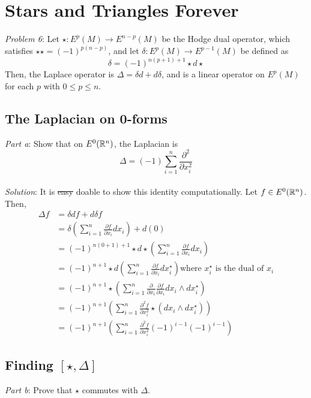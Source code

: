 \section{Stars and Triangles Forever}

\emph{Problem 6}: Let $\star: E^p(M)\to E^{n-p}(M)$ be the Hodge dual operator,
which satisfies $\star \star = (-1)^{p(n-p)}$, and let
$\delta: E^p(M) \to E^{p-1}(M)$ be defined as
\[
\delta = (-1)^{n(p+1)+1}\star d \star
\]
Then, the Laplace operator is
$\Delta = \delta d + d\delta$, and is a linear operator on $E^p(M)$ for each $p$
with $0 \leq p \leq n$. 

\subsection*{The Laplacian on 0-forms}
\emph{Part a}: Show that on $E^0(\mathbb{R}^n)$, the Laplacian is
\[
\Delta = (-1)\sum_{i=1}^n \frac{\partial^2}{\partial x_i^2}
\]
\\


\emph{Solution}:
It is \sout{easy} doable to show this identity computationally. Let $f\in
E^0(\mathbb{R}^n)$. Then,
\[
\begin{aligned}
\Delta f &= \delta df + d\delta f\\
         &= \delta \left(\sum_{i=1}^{n}
                \frac{\partial f}{\partial x_i}dx_i\right) + d(0)\\
         &= (-1)^{n(0+1)+1}\star d \star \left(\sum_{i=1}^{n}
                \frac{\partial f}{\partial x_i}dx_i\right)\\
         &= (-1)^{n+1} \star d \left(\sum_{i=1}^{n}
                \frac{\partial f}{\partial x_i}dx_i^{\star}\right)
                \text{where $x_i^{\star}$ is the dual of $x_i$}\\
         &= (-1)^{n+1} \star \left(\sum_{i=1}^{n}\frac{\partial}{\partial x_i}
                \frac{\partial f}{\partial x_i}dx_i \wedge dx_i^{\star}\right)\\
         &= (-1)^{n+1}\left(\sum_{i=1}^{n}
                \frac{\partial^2 f}{\partial x_i^2}
                \star(dx_i \wedge dx_i^{\star})\right)\\
         &= (-1)^{n+1}\left(\sum_{i=1}^{n}
                \frac{\partial^2 f}{\partial x_i^2}
                (-1)^{i-1}(-1)^{i-1}\right)
\end{aligned}
\]
\subsection*{Finding $[\star,\Delta]$}
\emph{Part b}: Prove that $\star$ commutes with $\Delta$.
\\

